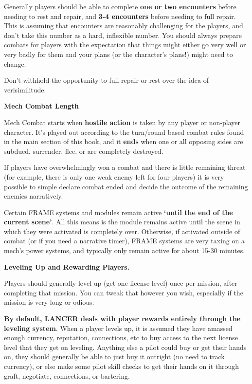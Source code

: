 Generally players should be able to complete \textbf{one or two encounters} before needing to rest and
repair, and \textbf{3-4 encounters} before needing to full repair. This is assuming that encounters are
reasonably challenging for the players, and don't take this number as a hard, inflexible number.
You should always prepare combats for players with the expectation that things might either go
very well or very badly for them and your plans (or the character's plans!) might need to change.

Don't withhold the opportunity to full repair or rest over the idea of verisimilitude.

\begin{center}
     \textbf{Mech Combat Length}
\end{center}

Mech Combat starts when \textbf{hostile action} is taken by any player or non-player character. It's
played out according to the turn/round based combat rules found in the main section of this
book, and it \textbf{ends} when one or all opposing sides are subdued, surrender, flee, or are completely
destroyed.

If players have overwhelmingly won a combat and there is little remaining threat (for example,
there is only one weak enemy left for four players) it is very possible to simple declare combat
ended and decide the outcome of the remaining enemies narratively.

Certain FRAME systems and modules remain active \textbf{`until the end of the current scene'}. All this
means is the module remains active until the scene in which they were activated is completely
over. Otherwise, if activated outside of combat (or if you need a narrative timer), FRAME systems
are very taxing on a mech's power systems, and typically only remain active for about 15-30
minutes.

\begin{center}
\textbf{Leveling Up and Rewarding Players.}
\end{center}

Players should generally level up (get one license level) once per mission, after completing that
mission. You can tweak that however you wish, especially if the mission is very long or odious.

\textbf{By default, LANCER deals with player rewards entirely through the leveling system}. When a
player levels up, it is assumed they have amassed enough currency, reputation, connections, etc
to buy access to the next license level that they get on leveling. Anything else a pilot could buy
or get their hands on, they should generally be able to just buy it outright (no need to track
currency), or else make some pilot skill checks to get their hands on it through graft, negotiate,
connections, or bartering.

